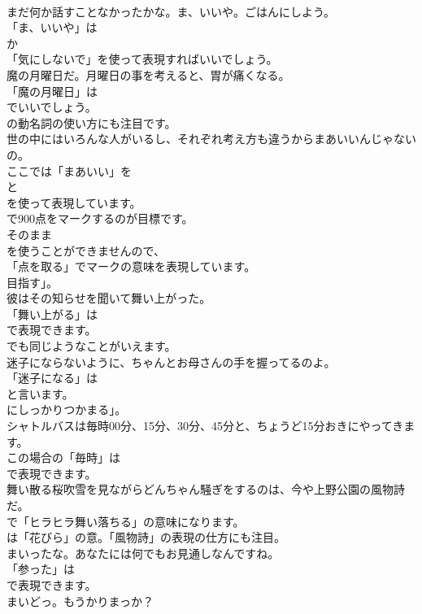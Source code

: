 \documentclass[8pt]{extreport}
\begin{document}
\begin{CJK}{UTF8}{min}
\\	まだ何か話すことなかったかな。ま、いいや。ごはんにしよう。 
\\	「ま、いいや」は
\\	か
\\	「気にしないで」を使って表現すればいいでしょう。	
\\	魔の月曜日だ。月曜日の事を考えると、胃が痛くなる。 
\\	「魔の月曜日」は 
\\	でいいでしょう。
\\	の動名詞の使い方にも注目です。	
\\	世の中にはいろんな人がいるし、それぞれ考え方も違うからまあいいんじゃないの。 
\\	ここでは「まあいい」を 
\\	と 
\\	を使って表現しています。	
\\	で900点をマークするのが目標です。 
\\	そのまま
\\	を使うことができませんので、
\\	「点を取る」でマークの意味を表現しています。
\\	目指す」。	
\\	彼はその知らせを聞いて舞い上がった。 
\\	「舞い上がる」は 
\\	で表現できます。
\\	でも同じようなことがいえます。	
\\	迷子にならないように、ちゃんとお母さんの手を握ってるのよ。 
\\	「迷子になる」は
\\	と言います。
\\	にしっかりつかまる」。	
\\	シャトルバスは毎時00分、15分、30分、45分と、ちょうど15分おきにやってきます。 
\\	この場合の「毎時」は
\\	で表現できます。	
\\	舞い散る桜吹雪を見ながらどんちゃん騒ぎをするのは、今や上野公園の風物詩だ。 
\\	で「ヒラヒラ舞い落ちる」の意味になります。
\\	は「花びら」の意。「風物詩」の表現の仕方にも注目。	
\\	まいったな。あなたには何でもお見通しなんですね。 
\\	「参った」は
\\	で表現できます。	
\\	まいどっ。もうかりまっか？ 

\end{CJK}
\end{document}
